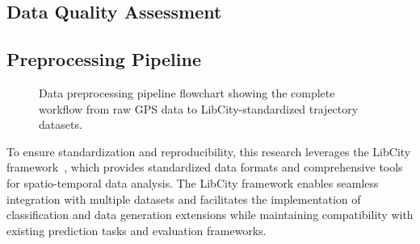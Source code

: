 \documentclass[runningheads]{llncs}
\begin{document}
\subsection{Data Quality Assessment}
\label{sec:quality-assessment}

\begin{compactoutline}
\end{compactoutline}

\subsection{Preprocessing Pipeline}
\label{sec:preprocessing}

\begin{figure}[h]
\centering
\caption{Data preprocessing pipeline flowchart showing the complete workflow from raw GPS data to LibCity-standardized trajectory datasets.}
\label{fig:preprocessing-flowchart}
\end{figure}

\begin{compactoutline}

  To ensure standardization and reproducibility, this research leverages the LibCity framework~\cite{libcitylong}, which provides standardized data formats and comprehensive tools for spatio-temporal data analysis. The LibCity framework enables seamless integration with multiple datasets and facilitates the implementation of classification and data generation extensions while maintaining compatibility with existing prediction tasks and evaluation frameworks.

\end{compactoutline}
\end{document}
